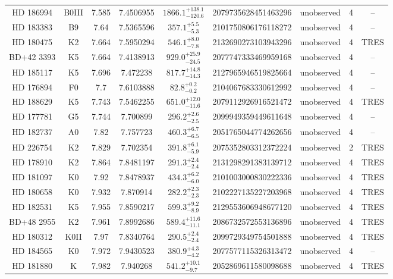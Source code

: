 \begin{table*}
\begin{tabular}{ccccccccc}
HD 186994 & B0III & 7.585 & 7.4506955 & $1866.1^{+138.1}_{-120.6}$ & 2079735628451463296 & unobserved & 4 & -- \\
HD 183383 & B9 & 7.64 & 7.5365596 & $357.1^{+5.5}_{-5.3}$ & 2101750806176118272 & unobserved & 4 & -- \\
HD 180475 & K2 & 7.664 & 7.5950294 & $546.1^{+8.0}_{-7.8}$ & 2132690273103943296 & unobserved & 4 & TRES \\
BD+42 3393 & K5 & 7.664 & 7.4138913 & $929.0^{+25.9}_{-24.5}$ & 2077747333469959168 & unobserved & 4 & -- \\
HD 185117 & K5 & 7.696 & 7.472238 & $817.7^{+14.8}_{-14.3}$ & 2127965946519825664 & unobserved & 4 & -- \\
HD 176894 & F0 & 7.7 & 7.6103888 & $82.8^{+0.2}_{-0.2}$ & 2104067683330612992 & unobserved & 4 & -- \\
HD 188629 & K5 & 7.743 & 7.5462255 & $651.0^{+12.0}_{-11.6}$ & 2079112926916521472 & unobserved & 4 & TRES \\
HD 177781 & G5 & 7.744 & 7.700899 & $296.2^{+2.6}_{-2.5}$ & 2099949359449611648 & unobserved & 4 & -- \\
HD 182737 & A0 & 7.82 & 7.757723 & $460.3^{+6.7}_{-6.5}$ & 2051765044774262656 & unobserved & 4 & -- \\
HD 226754 & K2 & 7.829 & 7.702354 & $391.8^{+6.1}_{-5.9}$ & 2075352803312372224 & unobserved & 2 & TRES \\
HD 178910 & K2 & 7.864 & 7.8481197 & $291.3^{+2.4}_{-2.4}$ & 2131298291383139712 & unobserved & 4 & TRES \\
HD 181097 & K0 & 7.92 & 7.8478937 & $434.3^{+6.2}_{-6.0}$ & 2101003000830222336 & unobserved & 4 & TRES \\
HD 180658 & K0 & 7.932 & 7.870914 & $282.2^{+2.3}_{-2.3}$ & 2102227135227203968 & unobserved & 4 & TRES \\
HD 182531 & K5 & 7.955 & 7.8590217 & $599.3^{+9.2}_{-8.9}$ & 2129553606948677120 & unobserved & 4 & TRES \\
BD+48 2955 & K2 & 7.961 & 7.8992686 & $589.4^{+11.6}_{-11.1}$ & 2086732572553136896 & unobserved & 4 & TRES \\
HD 180312 & K0II & 7.97 & 7.8340764 & $290.5^{+2.4}_{-2.4}$ & 2099729349754501888 & unobserved & 4 & TRES \\
HD 184565 & K0 & 7.972 & 7.9430523 & $380.9^{+4.3}_{-4.2}$ & 2077577115326313472 & unobserved & 4 & -- \\
HD 181880 & K & 7.982 & 7.940268 & $541.2^{+10.1}_{-9.7}$ & 2052869611580098688 & unobserved & 4 & TRES \\

\end{tabular}
\end{table*}
